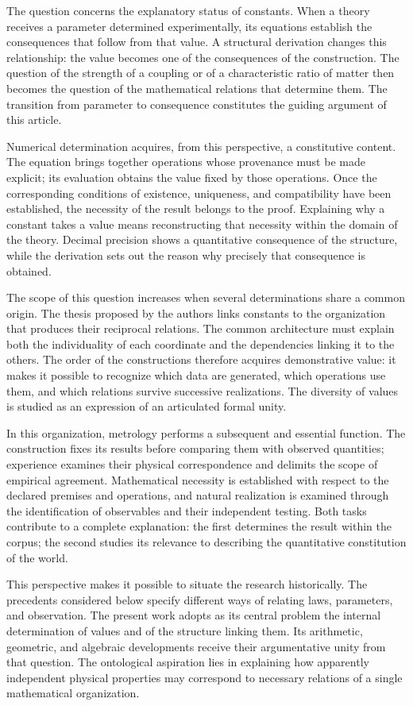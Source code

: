 The question concerns the explanatory status of constants. When a
theory receives a parameter determined experimentally, its equations
establish the consequences that follow from that value. A structural
derivation changes this relationship: the value becomes one of the
consequences of the construction. The question of the strength of a
coupling or of a characteristic ratio of matter then becomes
the question of the mathematical relations that determine them.
The transition from parameter to consequence constitutes the guiding argument
of this article.

Numerical determination acquires, from this perspective, a constitutive
content. The equation brings together operations whose provenance must be made
explicit; its evaluation obtains the value fixed by those operations. Once
the corresponding conditions of existence, uniqueness, and compatibility
have been established, the necessity of the result belongs to the proof.
Explaining why a constant takes a value means reconstructing that
necessity within the domain of the theory. Decimal precision shows
a quantitative consequence of the structure, while the derivation
sets out the reason why precisely that consequence is obtained.

The scope of this question increases when several determinations
share a common origin. The thesis proposed by the authors links
constants to the organization that produces their reciprocal relations.
The common architecture must explain both the individuality of each
coordinate and the dependencies linking it to the others.
The order of the constructions therefore acquires demonstrative value:
it makes it possible to recognize which data are generated, which operations use them, and
which relations survive successive realizations. The diversity
of values is studied as an expression of an articulated formal unity.

In this organization, metrology performs a subsequent and
essential function. The construction fixes its results before comparing them with
observed quantities; experience examines their physical
correspondence and delimits the scope of empirical agreement. Mathematical necessity is established
with respect to the declared premises and operations, and natural
realization is examined through the identification of observables and their
independent testing. Both tasks contribute to a complete
explanation: the first determines the result within the corpus; the second
studies its relevance to describing the quantitative constitution of the
world.

This perspective makes it possible to situate the research historically. The
precedents considered below specify different ways of
relating laws, parameters, and observation. The present work adopts
as its central problem the internal determination of values and of the
structure linking them. Its arithmetic, geometric, and
algebraic developments receive their argumentative unity from that question. The
ontological aspiration lies in explaining how apparently independent
physical properties may correspond to necessary relations of a single
mathematical organization.
